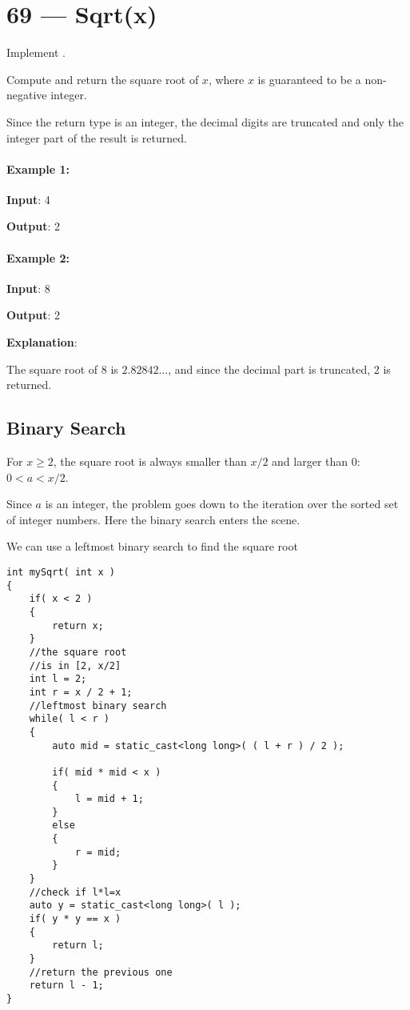 \section{69 --- Sqrt(x)}
Implement .

Compute and return the square root of $x$, where $x$ is guaranteed to be a non-negative integer.

Since the return type is an integer, the decimal digits are truncated and only the integer part of the result is returned.

\paragraph{Example 1:}

\begin{flushleft}
\textbf{Input}: 4

\textbf{Output}: 2
\end{flushleft}

\paragraph{Example 2:}

\begin{flushleft}
\textbf{Input}: 8

\textbf{Output}: 2

\textbf{Explanation}: 

The square root of 8 is $2.82842\ldots$, and since the decimal part is truncated, 2 is returned.
\end{flushleft}

\subsection{Binary Search}
For $x \ge 2$, the square root is always smaller than $x / 2$ and larger than 0: $0 < a < x / 2$.

Since $a$ is an integer, the problem goes down to the iteration over the sorted set of integer numbers. Here the binary search enters the scene.

We can use a leftmost binary search to find the square root

\setcounter{lstlisting}{0}
\begin{lstlisting}[style=customc, caption={Binary Search}]
int mySqrt( int x )
{
    if( x < 2 )
    {
        return x;
    }
    //the square root
    //is in [2, x/2]
    int l = 2;
    int r = x / 2 + 1;
    //leftmost binary search
    while( l < r )
    {
        auto mid = static_cast<long long>( ( l + r ) / 2 );

        if( mid * mid < x )
        {
            l = mid + 1;
        }
        else
        {
            r = mid;
        }
    }
    //check if l*l=x
    auto y = static_cast<long long>( l );
    if( y * y == x )
    {
        return l;
    }
    //return the previous one
    return l - 1;
}
\end{lstlisting}